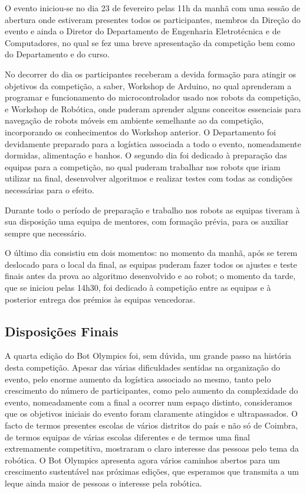 O evento iniciou-se no dia 23 de fevereiro pelas 11h da manhã com uma sessão de abertura onde estiveram presentes todos os participantes, membros da Direção do evento e ainda o Diretor do Departamento de Engenharia Eletrotécnica e de Computadores, no qual se fez uma breve apresentação da competição bem como do Departamento e do curso.

No decorrer do dia os participantes receberam a devida formação para atingir os objetivos da competição, a saber, Workshop de Arduino, no qual aprenderam a programar e funcionamento do microcontrolador usado nos robots da competição, e Workshop de Robótica, onde puderam aprender alguns conceitos essenciais para navegação de robots móveis em ambiente semelhante ao da competição, incorporando os conhecimentos do Workshop anterior. O Departamento foi devidamente preparado para a logística associada a todo o evento, nomeadamente dormidas, alimentação e banhos. O segundo dia foi dedicado à preparação das equipas para a competição, no qual puderam trabalhar nos robots que iriam utilizar na final, desenvolver algoritmos e realizar testes com todas as condições necessárias para o efeito.

Durante todo o período de preparação e trabalho nos robots as equipas tiveram à sua disposição uma equipa de mentores, com formação prévia, para os auxiliar sempre que necessário.

O último dia consistiu em dois momentos: no momento da manhã, após se terem deslocado para o local da final, as equipas puderam fazer todos os ajustes e teste finais antes da prova ao algoritmo desenvolvido e ao robot; o momento da tarde, que se iniciou pelas 14h30, foi dedicado à competição entre as equipas e à posterior entrega dos prémios às equipas vencedoras.

\subsection{Disposições Finais}

A quarta edição do Bot Olympics foi, sem dúvida, um grande passo na história desta competição. Apesar das várias dificuldades sentidas na organização do evento, pelo enorme aumento da logística associado ao mesmo, tanto pelo crescimento do número de participantes, como pelo aumento da complexidade do evento, nomeadamente com a final a ocorrer num espaço distinto, consideramos que os objetivos iniciais do evento foram claramente atingidos e ultrapassados. O facto de termos presentes escolas de vários distritos do país e não só de Coimbra, de termos equipas de várias escolas diferentes e de termos uma final extremamente competitiva, mostraram o claro interesse das pessoas pelo tema da robótica. O Bot Olympics apresenta agora vários caminhos abertos para um crescimento sustentável nas próximas edições, que esperamos que transmita a um leque ainda maior de pessoas o interesse pela robótica.